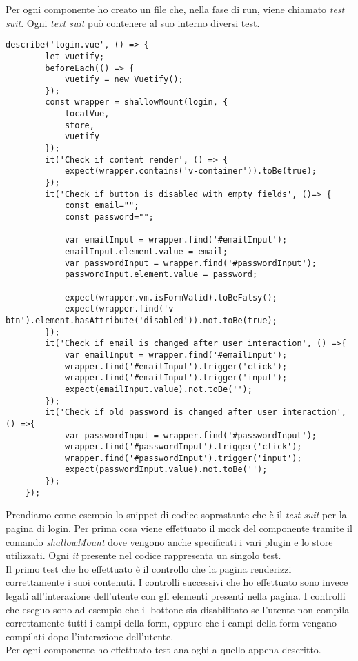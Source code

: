 Per ogni componente ho creato un file che, nella fase di run, viene chiamato \textit{test suit}. Ogni \textit{text suit} può contenere al suo interno diversi test.
\begin{lstlisting}[caption=Esempio di test-Pagina di login., label=lst::esTest]
	describe('login.vue', () => {
		let vuetify;
		beforeEach(() => {
			vuetify = new Vuetify();
		});
		const wrapper = shallowMount(login, {
			localVue,
			store,
			vuetify
		});
		it('Check if content render', () => {
			expect(wrapper.contains('v-container')).toBe(true);
		});
		it('Check if button is disabled with empty fields', ()=> {
			const email="";
			const password="";
			
			var emailInput = wrapper.find('#emailInput');
			emailInput.element.value = email;
			var passwordInput = wrapper.find('#passwordInput');
			passwordInput.element.value = password;
			
			expect(wrapper.vm.isFormValid).toBeFalsy();
			expect(wrapper.find('v-btn').element.hasAttribute('disabled')).not.toBe(true);
		});
		it('Check if email is changed after user interaction', () =>{
			var emailInput = wrapper.find('#emailInput');
			wrapper.find('#emailInput').trigger('click');
			wrapper.find('#emailInput').trigger('input');
			expect(emailInput.value).not.toBe('');
		});
		it('Check if old password is changed after user interaction', () =>{
			var passwordInput = wrapper.find('#passwordInput');
			wrapper.find('#passwordInput').trigger('click');
			wrapper.find('#passwordInput').trigger('input');
			expect(passwordInput.value).not.toBe('');
		});
	});
\end{lstlisting}
Prendiamo come esempio lo snippet di codice soprastante che è il \textit{test suit} per la pagina di login.
Per prima cosa viene effettuato il mock del componente tramite il comando \textit{shallowMount} dove vengono anche specificati i vari plugin e lo store utilizzati. Ogni \textit{it} presente nel codice rappresenta un singolo test.\\
Il primo test che ho effettuato è il controllo che la pagina renderizzi correttamente i suoi contenuti.
I controlli successivi che ho effettuato sono invece legati all'interazione dell'utente con gli elementi presenti nella pagina. I controlli che eseguo sono ad esempio che il bottone sia disabilitato se l'utente non compila correttamente tutti i campi della form, oppure che i campi della form vengano compilati dopo l'interazione dell'utente.\\
Per ogni componente ho effettuato test analoghi a quello appena descritto.

